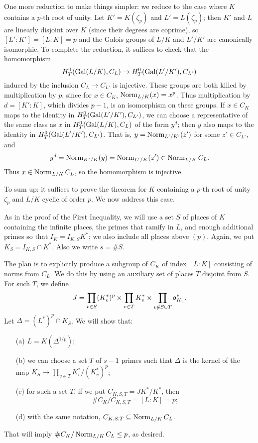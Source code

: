 One more reduction to make things simpler: we reduce to the case where
$K$ contains a $p$-th root of unity. Let $K' = K(\zeta_p)$ and $L' =
L(\zeta_p)$; then $K'$ and $L$ are linearly disjoint over $K$ (since
their degrees are coprime), so $[L':K'] = [L:K] = p$ and the Galois groups
of $L/K$ and $L'/K'$ are canonically isomorphic. To complete the reduction, it suffices to check
that the homomorphism
\[
H^0_T(\operatorname{Gal}(L/K), C_L) \to H^0_T(\operatorname{Gal}(L'/K'), C_{L'})
\]
induced by the inclusion $C_L \to C_{L'}$ is injective. These groups
are both killed by multiplication by $p$, since for $x \in C_K$,
$\operatorname{Norm}_{L/K} (x) = x^p$. Thus multiplication by $d = [K':K]$, which divides
$p-1$, is an isomorphism on these groups. If $x \in C_K$ maps to the
identity in $H^0_T(\operatorname{Gal}(L'/K'), C_{L'})$, we can choose a representative
of the same class as $x$ in $H^0_T(\operatorname{Gal}(L/K), C_L)$ of the form $y^d$;
then $y$ also maps to the identity in $H^0_T(\operatorname{Gal}(L'/K'), C_{L'})$.
That is, $y = \operatorname{Norm}_{L'/K'}(z')$ for some $z' \in C_{L'}$, and
\[
y^d = \operatorname{Norm}_{K'/K}(y) = \operatorname{Norm}_{L'/K}(z') \in \operatorname{Norm}_{L/K} C_L.
\]
Thus $x \in \operatorname{Norm}_{L/K} C_L$, so the homomorphism is injective.


To sum up: it suffices to prove the theorem for $K$ containing a $p$-th
root of unity $\zeta_p$ and $L/K$ cyclic of order $p$. We now address
this case.

As in the proof of the First Inequality, we will use a set $S$ of places
of $K$ containing the infinite places, the primes that ramify in $L$,
and enough additional primes so that $I_K = I_{K,S} K^*$; we also include all places above $(p)$. Again, we
put $K_S = I_{K,S} \cap K^*$. Also we write $s = \# S$.

The plan is to explicitly produce a subgroup of $C_K$ of index $[L:K]$
consisting of norms from $C_L$. We do this by using an auxiliary set of 
places $T$ disjoint from $S$. For such $T$, we define
\[
J = \prod_{v \in S} (K_v^*)^p \times \prod_{v \in T} K_v^*
\times \prod_{v \notin S \cup T} \mathfrak{o}_{K_v}^*.
\]
Let $\Delta = (L^*)^p \cap K_S$. We will show that:
\begin{enumerate}
\item[(a)] $L = K(\Delta^{1/p})$;
\item[(b)] we can choose a set $T$ of $s-1$ primes such that $\Delta$
is the kernel of the map $K_S \to \prod_{v \in T} K_v^*/(K_v^*)^p$;
\item[(c)] for such a set $T$, if we put $C_{K,S,T} = J K^*/K^*$,
then
\[
\#C_K/C_{K,S,T} = [L:K] = p;
\]
\item[(d)]
with the same notation, $C_{K,S,T} \subseteq \operatorname{Norm}_{L/K} C_L$.
\end{enumerate}
That will imply $\#C_K/\operatorname{Norm}_{L/K} C_L \leq p$, as desired.

